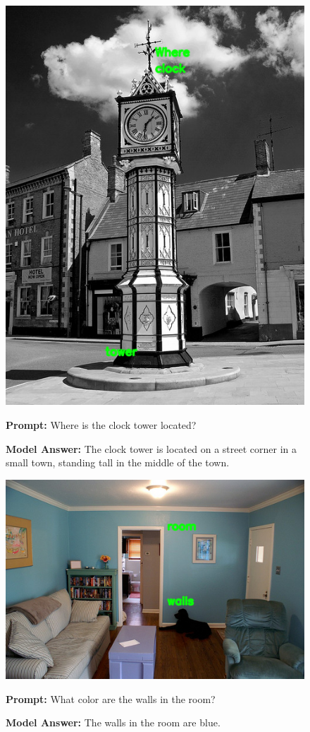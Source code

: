 \documentclass[11pt]{article}
\begin{document}
\begin{figure}[H]
    \centering
    \includegraphics[width=0.6\linewidth]{iclr2026/reordering_178.png}\par
    \vspace{1em}
    \raggedright
    \textbf{Prompt:} Where is the clock tower located?
    
    \textbf{Model Answer:} The clock tower is located on a street corner in a small town, standing tall in the middle of the town.
\end{figure}


\begin{figure}[H]
    \centering
    \includegraphics[width=0.6\linewidth]{iclr2026/reordering_179.png}\par
    \vspace{1em}
    \raggedright
    \textbf{Prompt:} What color are the walls in the room?
    
    \textbf{Model Answer:} The walls in the room are blue.
\end{figure}
\end{document}
